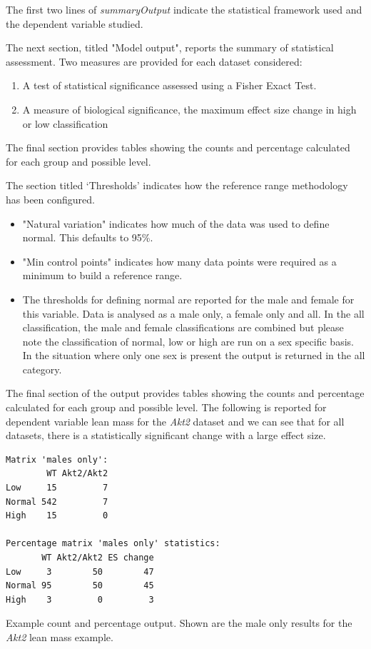 \documentclass[12pt,a4paper]{article}
\begin{document}
The first two lines of \textit{summaryOutput} indicate the statistical framework used and the dependent variable studied.  

The next section, titled "Model output", reports the summary of statistical assessment. Two measures are provided for each dataset considered:
\begin{enumerate}
\item A test of statistical significance assessed using a Fisher Exact Test. 
\item A measure of biological significance, the maximum effect size change in high or low classification
\end{enumerate}
The final section provides tables showing the counts and percentage calculated for each group and possible level. 

The section titled ‘Thresholds’ indicates how the reference range methodology has been configured.  
\begin{itemize}
\item "Natural variation" indicates how much of the data was used to define normal.  This defaults to 95\%. 
\item "Min control points" indicates how many data points were required as a minimum to build a reference range.  
\item The thresholds for defining normal are reported for the male and female for this variable.  Data is analysed as a male only, a female only and all.  In the all classification, the male and female classifications are combined but please note the classification of normal, low or high are run on a sex specific basis.  In the situation where only one sex is present the output is returned in the all category. 
\end{itemize}

The final section of the output provides tables showing the counts and percentage calculated for each group and possible level. The following is reported for dependent variable lean mass for the \textit{Akt2} dataset and we can see that for all datasets, there is a statistically significant change with a large effect size.


\begingroup
    \fontsize{8pt}{12pt}\selectfont
\begin{verbatim}
Matrix 'males only':
        WT Akt2/Akt2
Low     15         7
Normal 542         7
High    15         0

Percentage matrix 'males only' statistics:
       WT Akt2/Akt2 ES change
Low     3        50        47
Normal 95        50        45
High    3         0         3
\end{verbatim}
\endgroup 
Example count and percentage output.  Shown are the male only results for the \textit{Akt2} lean mass example.
\end{document}
